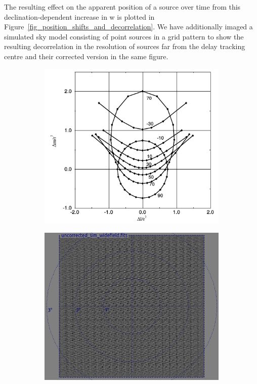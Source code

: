 The resulting effect on the apparent position of a source over time from this declination-dependent increase in w is plotted in Figure~\ref{fig_position_shifts_and_decorrelation}. We have 
additionally imaged a simulated sky model consisting of point sources in a grid pattern to show the resulting decorrelation in the resolution of sources far from the delay tracking centre 
and their corrected version in the same figure.

\begin{figure}[ht!]
  \begin{mdframed}
    \centering
    \begin{subfigure}[b]{0.62\textwidth}
      \centering
      \includegraphics[width=\textwidth]{images/apparent_position_shifts.png}
      \caption{}
    \end{subfigure}
    \begin{subfigure}[b]{0.49\textwidth}
      \centering
      \includegraphics[width=\textwidth]{images/widefield_meerkat.png}

\end{subfigure}
\end{mdframed}
\end{figure}

